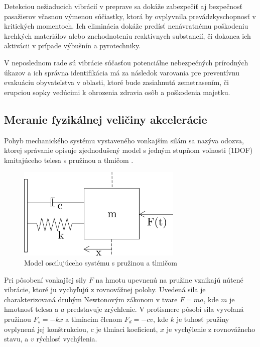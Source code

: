Detekciou nežiaducich vibrácií v preprave sa dokáže zabezpečiť aj bezpečnosť pasažierov včasnou výmenou súčiastky, ktorá by ovplyvnila
prevádzkyschopnosť v kritických momentoch. Ich eliminácia dokáže predísť nenávratnému poškodeniu krehkých materiálov alebo
znehodnoteniu reaktívnych substancií, či dokonca ich aktivácii v prípade výbušnín a pyrotechniky.

V neposlednom rade sú vibrácie súčasťou potenciálne nebezpečných prírodných úkazov a ich správna identifikácia má za následok varovania
pre preventívnu evakuáciu obyvateľstva v oblasti, ktoré bude zasiahnutá zemetrasením, či erupciou sopky vedúcimi k ohrozenia zdravia
osôb a poškodenia majetku.

\subsection{Meranie fyzikálnej veličiny akcelerácie}
Pohyb mechanického systému vystaveného vonkajším silám sa nazýva odozva, ktorej správanie opisuje zjednodušený model s jedným stupňom
voľnosti (1DOF) kmitajúceho telesa s pružinou a tlmičom \cite{vibrations-shock}.

\begin{figure}[h]
	\centering
	\includegraphics[width=0.7\textwidth]{figures/mass-spring-damper-model.png}
	\caption{Model oscilujúceho systému s pružinou a tlmičom}
\end{figure}

Pri pôsobení vonkajšej sily $F$ na hmotu upevnenú na pružine vznikajú nútené vibrácie, ktoré ju vychyľujú z rovnovážnej polohy. Uvedená sila je charakterizovaná druhým Newtonovým zákonom v tvare $F = ma$, kde $m$ je hmotnosť telesa a $a$ predstavuje zrýchlenie. V protismere pôsobí sila vyvolaná pružinou $F_s = -kx$ a tlmiacim členom $F_d = -cv$, kde $k$ je tuhosť pružiny ovplynená jej konštrukciou, $c$ je tlmiaci koeficient, $x$ je vychýlenie z rovnovážneho stavu, a $v$ rýchlosť vychýlenia. 


